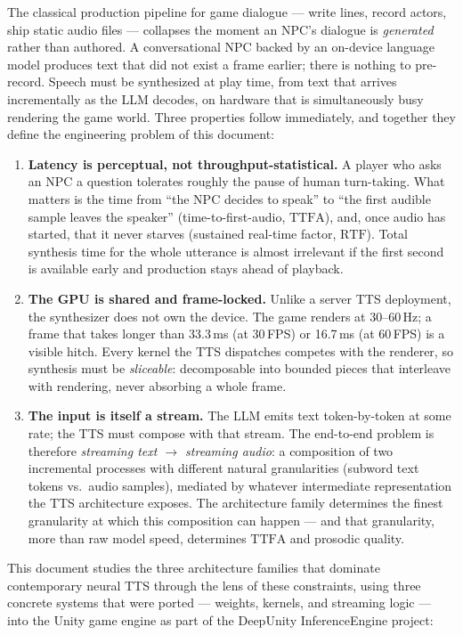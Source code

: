 \documentclass[11pt,a4paper]{article}
\newcommand{\RTF}{\ensuremath{\mathrm{RTF}}}
\newcommand{\TTFA}{\ensuremath{\mathrm{TTFA}}}
\begin{document}
The classical production pipeline for game dialogue --- write lines, record actors, ship
static audio files --- collapses the moment an NPC's dialogue is \emph{generated} rather
than authored. A conversational NPC backed by an on-device language model produces text
that did not exist a frame earlier; there is nothing to pre-record. Speech must be
synthesized at play time, from text that arrives incrementally as the LLM decodes, on
hardware that is simultaneously busy rendering the game world. Three properties follow
immediately, and together they define the engineering problem of this document:

\begin{enumerate}[leftmargin=2em]
\item \textbf{Latency is perceptual, not throughput-statistical.} A player who asks an
NPC a question tolerates roughly the pause of human turn-taking. What matters is the time
from ``the NPC decides to speak'' to ``the first audible sample leaves the speaker''
(time-to-first-audio, \TTFA{}), and, once audio has started, that it never starves
(sustained real-time factor, \RTF{}). Total synthesis time for the whole utterance is
almost irrelevant if the first second is available early and production stays ahead of
playback.
\item \textbf{The GPU is shared and frame-locked.} Unlike a server TTS deployment, the
synthesizer does not own the device. The game renders at 30--60\,Hz; a frame that takes
longer than 33.3\,ms (at 30\,FPS) or 16.7\,ms (at 60\,FPS) is a visible hitch. Every
kernel the TTS dispatches competes with the renderer, so synthesis must be
\emph{sliceable}: decomposable into bounded pieces that interleave with rendering,
never absorbing a whole frame.
\item \textbf{The input is itself a stream.} The LLM emits text token-by-token at some
rate; the TTS must compose with that stream. The end-to-end problem is therefore
\emph{streaming text $\rightarrow$ streaming audio}: a composition of two incremental
processes with different natural granularities (subword text tokens vs.\ audio samples),
mediated by whatever intermediate representation the TTS architecture exposes. The
architecture family determines the finest granularity at which this composition can
happen --- and that granularity, more than raw model speed, determines \TTFA{} and
prosodic quality.
\end{enumerate}

This document studies the three architecture families that dominate contemporary neural
TTS through the lens of these constraints, using three concrete systems that were ported
--- weights, kernels, and streaming logic --- into the Unity game engine as part of the
DeepUnity InferenceEngine project:
\end{document}
